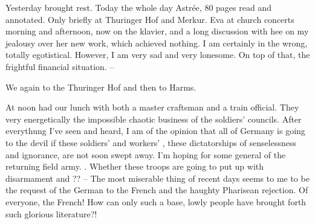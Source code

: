 
Yesterday brought rest. Today the whole day Astrée, 80 pages read and annotated. Only briefly at Thuringer Hof and Merkur. Eva at church concerts morning and afternoon, now on the klavier, and a long discussion with hee on my jealousy over her new work, which achieved nothing. I am certainly in the wrong, totally egotistical. However, I am very sad and very lonesome. On top of that, the frightful financial situation. --

We  again to the Thuringer Hof and then to Harms.

At noon had our lunch with both a master craftsman and a train official. They very energetically  the impossible chaotic business of the soldiers' councils. After everythung I've seen and heard, I am of the opinion that all of Germany is going to the devil if these soldiers' and workers' , these dictatorships of senselessness and ignorance, are not soon swept away. I'm hoping for some general of the returning field army. . Whether these troops are going to put up with disarmament and ?? -- The most miserable thing of recent days seems to me to be the request of the German  to the French and the haughty Pharisean rejection. Of everyone, the French! How can only such a base, lowly people have brought forth such glorious literature?!
\missing

